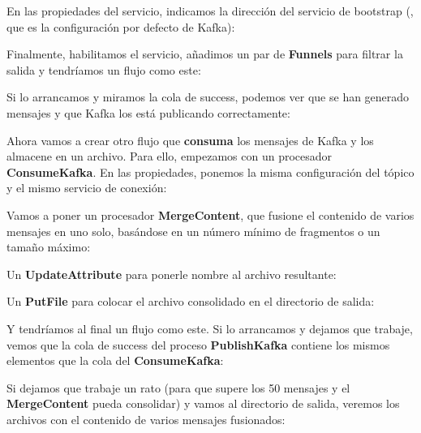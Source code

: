 \documentclass{../../../miPlantilla}
\begin{document}

En las propiedades del servicio, indicamos la dirección del servicio de bootstrap (, que es la configuración por defecto de Kafka):


\newpage

Finalmente, habilitamos el servicio, añadimos un par de \textbf{Funnels} para filtrar la salida y tendríamos un flujo como este:


Si lo arrancamos y miramos la cola de success, podemos ver que se han generado mensajes y que Kafka los está publicando correctamente:


Ahora vamos a crear otro flujo que \textbf{consuma} los mensajes de Kafka y los almacene en un archivo. Para ello, empezamos con un procesador \textbf{ConsumeKafka}. En las propiedades, ponemos la misma configuración del tópico y el mismo servicio de conexión:


\newpage

Vamos a poner un procesador \textbf{MergeContent}, que fusione el contenido de varios mensajes en uno solo, basándose en un número mínimo de fragmentos o un tamaño máximo:


Un \textbf{UpdateAttribute} para ponerle nombre al archivo resultante:


Un \textbf{PutFile} para colocar el archivo consolidado en el directorio de salida:


\newpage

Y tendríamos al final un flujo como este. Si lo arrancamos y dejamos que trabaje, vemos que la cola de success del proceso \textbf{PublishKafka} contiene los mismos elementos que la cola del \textbf{ConsumeKafka}:


Si dejamos que trabaje un rato (para que supere los 50 mensajes y el \textbf{MergeContent} pueda consolidar) y vamos al directorio de salida, veremos los archivos con el contenido de varios mensajes fusionados:

\end{document}
